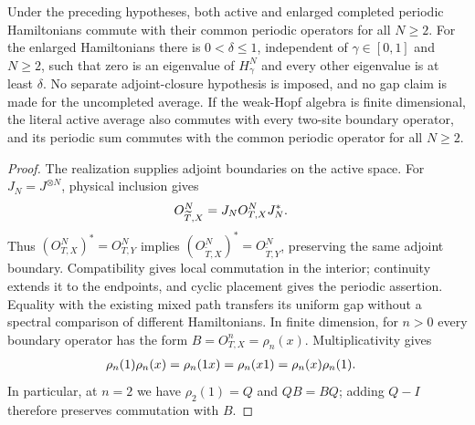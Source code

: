 \begin{lemma}
    \label{lem:mpo_mixed_wha_symmetry_gap}
    \leanok
    Under the preceding hypotheses, both active and enlarged completed
    periodic Hamiltonians commute with their common periodic operators
    for all $N\ge2$. For the enlarged Hamiltonians there is
    $0<\delta\le1$, independent of $\gamma\in[0,1]$ and $N\ge2$,
    such that zero is an eigenvalue of $H_\gamma^N$ and every other
    eigenvalue is at least $\delta$. No separate adjoint-closure hypothesis is
    imposed, and no gap claim is made for the uncompleted average.
    If the weak-Hopf algebra is finite dimensional, the literal active
    average also commutes with every two-site boundary operator, and its
    periodic sum commutes with the common periodic operator for all $N\ge2$.
\end{lemma}
\begin{proof}
    \leanok
    The realization supplies adjoint boundaries on the active space.
    For $J_N=J^{\otimes N}$, physical inclusion gives
    \begin{align}
        O^N_{\widetilde T,X} & =J_N O^N_{T,X}J_N^*.
        \notag
    \end{align}
    Thus $(O^N_{T,X})^*=O^N_{T,Y}$ implies
    $(O^N_{\widetilde T,X})^*=O^N_{\widetilde T,Y}$, preserving the same
    adjoint boundary.
    Compatibility gives local commutation in the interior; continuity
    extends it to the endpoints, and cyclic placement gives the periodic
    assertion. Equality with the existing mixed path transfers its
    uniform gap without a spectral comparison of different Hamiltonians.
    In finite dimension, for $n>0$ every boundary operator has the form
    $B=O^n_{T,X}=\rho_n(x)$. Multiplicativity gives
    \begin{align}
        \rho_n(1)\rho_n(x) & =\rho_n(1x)=\rho_n(x1)
        =\rho_n(x)\rho_n(1).
        \notag
    \end{align}
    In particular, at $n=2$ we have $\rho_2(1)=Q$ and $QB=BQ$;
    adding $Q-I$ therefore preserves commutation with $B$.
\end{proof}
